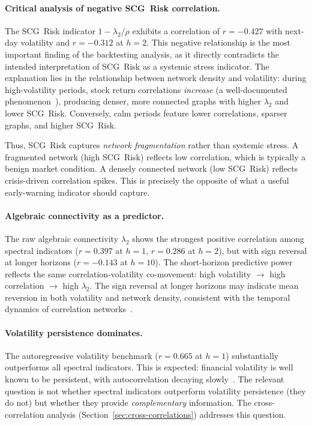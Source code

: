 \paragraph{Critical analysis of negative SCG~Risk correlation.}
The SCG~Risk indicator $1 - \lambda_2/\rho$ exhibits a correlation of $r = -0.427$ with next-day volatility and $r = -0.312$ at $h=2$. This negative relationship is the most important finding of the backtesting analysis, as it directly contradicts the intended interpretation of SCG~Risk as a systemic stress indicator. The explanation lies in the relationship between network density and volatility: during high-volatility periods, stock return correlations \emph{increase} (a well-documented phenomenon~\cite{mantegna1999introduction,laloux1999noise}), producing denser, more connected graphs with higher $\lambda_2$ and lower SCG~Risk. Conversely, calm periods feature lower correlations, sparser graphs, and higher SCG~Risk.

Thus, SCG~Risk captures \emph{network fragmentation} rather than systemic stress. A fragmented network (high SCG~Risk) reflects low correlation, which is typically a benign market condition. A densely connected network (low SCG~Risk) reflects crisis-driven correlation spikes. This is precisely the opposite of what a useful early-warning indicator should capture.

\paragraph{Algebraic connectivity as a predictor.}
The raw algebraic connectivity $\lambda_2$ shows the strongest positive correlation among spectral indicators ($r = 0.397$ at $h=1$, $r = 0.286$ at $h=2$), but with sign reversal at longer horizons ($r = -0.143$ at $h=10$). The short-horizon predictive power reflects the same correlation-volatility co-movement: high volatility $\to$ high correlation $\to$ high $\lambda_2$. The sign reversal at longer horizons may indicate mean reversion in both volatility and network density, consistent with the temporal dynamics of correlation networks~\cite{holme2012temporal}.

\paragraph{Volatility persistence dominates.}
The autoregressive volatility benchmark ($r = 0.665$ at $h=1$) substantially outperforms all spectral indicators. This is expected: financial volatility is well known to be persistent, with autocorrelation decaying slowly~\cite{mantegna1999introduction}. The relevant question is not whether spectral indicators outperform volatility persistence (they do not) but whether they provide \emph{complementary} information. The cross-correlation analysis (Section~\ref{sec:cross-correlations}) addresses this question.


